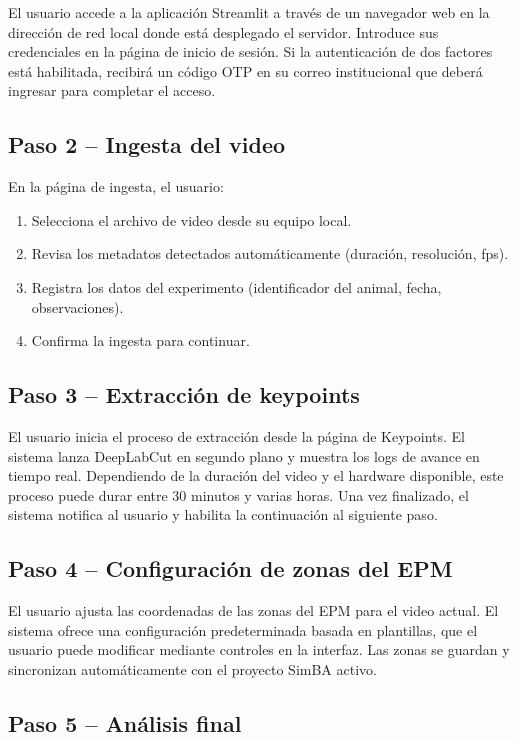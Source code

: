 \documentclass[12pt]{report}
\begin{document}
El usuario accede a la aplicación Streamlit a través de un navegador web en
la dirección de red local donde está desplegado el servidor. Introduce sus
credenciales en la página de inicio de sesión. Si la autenticación de dos
factores está habilitada, recibirá un código OTP en su correo institucional
que deberá ingresar para completar el acceso.

\subsection{Paso 2 -- Ingesta del video}

En la página de ingesta, el usuario:
\begin{enumerate}[label=\alph*.]
    \item Selecciona el archivo de video desde su equipo local.
    \item Revisa los metadatos detectados automáticamente (duración, resolución, fps).
    \item Registra los datos del experimento (identificador del animal, fecha, observaciones).
    \item Confirma la ingesta para continuar.
\end{enumerate}

\subsection{Paso 3 -- Extracción de keypoints}

El usuario inicia el proceso de extracción desde la página de Keypoints.
El sistema lanza DeepLabCut en segundo plano y muestra los logs de avance en
tiempo real. Dependiendo de la duración del video y el hardware disponible,
este proceso puede durar entre 30 minutos y varias horas. Una vez finalizado,
el sistema notifica al usuario y habilita la continuación al siguiente paso.

\subsection{Paso 4 -- Configuración de zonas del EPM}

El usuario ajusta las coordenadas de las zonas del EPM para el video actual.
El sistema ofrece una configuración predeterminada basada en plantillas, que
el usuario puede modificar mediante controles en la interfaz. Las zonas se
guardan y sincronizan automáticamente con el proyecto SimBA activo.

\subsection{Paso 5 -- Análisis final}
\end{document}

